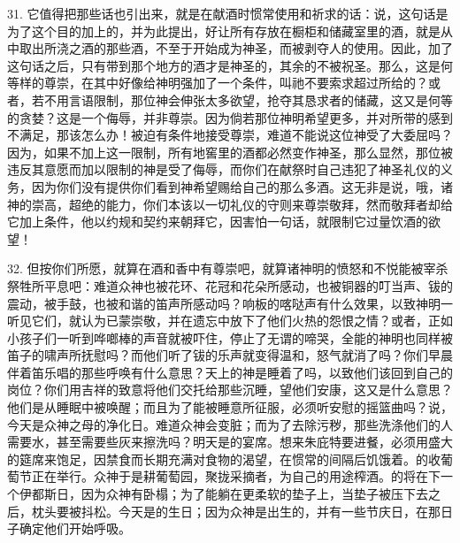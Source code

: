 31. 它值得把那些话也引出来，就是在献酒时惯常使用和祈求的话：说，这句话是为了这个目的加上的，并为此提出，好让所有存放在橱柜和储藏室里的酒，就是从中取出所浇之酒的那些酒，不至于开始成为神圣，而被剥夺人的使用。因此，加了这句话之后，只有带到那个地方的酒才是神圣的，其余的不被祝圣。那么，这是何等样的尊崇，在其中好像给神明强加了一个条件，叫祂不要索求超过所给的？或者，若不用言语限制，那位神会伸张太多欲望，抢夺其恳求者的储藏，这又是何等的贪婪？这是一个侮辱，并非尊崇。因为倘若那位神明希望更多，并对所带的感到不满足，那该怎么办！被迫有条件地接受尊崇，难道不能说这位神受了大委屈吗？因为，如果不加上这一限制，所有地窖里的酒都必然变作神圣，那么显然，那位被违反其意愿而加以限制的神是受了侮辱，而你们在献祭时自己违犯了神圣礼仪的义务，因为你们没有提供你们看到神希望赐给自己的那么多酒。这无非是说，哦，诸神的崇高，超绝的能力，你们本该以一切礼仪的守则来尊崇敬拜，然而敬拜者却给它加上条件，他以约规和契约来朝拜它，因害怕一句话，就限制它过量饮酒的欲望！\par

32. 但按你们所愿，就算在酒和香中有尊崇吧，就算诸神明的愤怒和不悦能被宰杀祭牲所平息吧：难道众神也被花环、花冠和花朵所感动，也被铜器的叮当声、钹的震动，被手鼓，也被和谐的笛声所感动吗？响板的喀哒声有什么效果，以致神明一听见它们，就认为已蒙崇敬，并在遗忘中放下了他们火热的怨恨之情？或者，正如小孩子们一听到哗啷棒的声音就被吓住，停止了无谓的啼哭，全能的神明也同样被笛子的啸声所抚慰吗？而他们听了钹的乐声就变得温和，怒气就消了吗？你们早晨伴着笛乐唱的那些呼唤有什么意思？天上的神是睡着了吗，以致他们该回到自己的岗位？你们用吉祥的致意将他们交托给那些沉睡，望他们安康，这又是什么意思？他们是从睡眠中被唤醒；而且为了能被睡意所征服，必须听安慰的摇篮曲吗？说，今天是众神之母的净化日。难道众神会变脏；而为了去除污秽，那些洗涤他们的人需要水，甚至需要些灰来擦洗吗？明天是的宴席。想来朱庇特要进餐，必须用盛大的筵席来饱足，因禁食而长期充满对食物的渴望，在惯常的间隔后饥饿着。的收葡萄节正在举行。众神于是耕葡萄园，聚拢采摘者，为自己的用途榨酒。的将在下一个伊都斯日，因为众神有卧榻；为了能躺在更柔软的垫子上，当垫子被压下去之后，枕头要被抖松。今天是的生日；因为众神是出生的，并有一些节庆日，在那日子确定他们开始呼吸。\par

